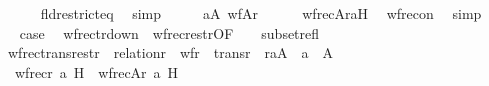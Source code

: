 \begin{isabellebody}
\ \ \ \ \isamarkupfalse%
\ fld{\isacharunderscore}{\kern0pt}restrict{\isacharunderscore}{\kern0pt}eq\ \isamarkupfalse%
\ simp\isanewline
\ \ \isamarkupfalse%
\ \isamarkupfalse%
\ {\isacartoucheopen}a{\isasymin}A{\isacartoucheclose}\ {\isacartoucheopen}wf{\isacharbrackleft}{\kern0pt}A{\isacharbrackright}{\kern0pt}{\isacharparenleft}{\kern0pt}r{\isacharparenright}{\kern0pt}{\isacartoucheclose}\isanewline
\ \ \isamarkupfalse%
\ {\isachardoublequoteopen}{\isachardot}{\kern0pt}{\isachardot}{\kern0pt}{\isachardot}{\kern0pt}\ {\isacharequal}{\kern0pt}\ wfrec{\isacharbrackleft}{\kern0pt}A{\isacharbrackright}{\kern0pt}{\isacharparenleft}{\kern0pt}r{\isacharcomma}{\kern0pt}a{\isacharcomma}{\kern0pt}H{\isacharparenright}{\kern0pt}{\isachardoublequoteclose}\ \isamarkupfalse%
\ wfrec{\isacharunderscore}{\kern0pt}on\ \isamarkupfalse%
\ simp\isanewline
\ \ \isamarkupfalse%
\ \isamarkupfalse%
\ {\isacharquery}{\kern0pt}case\ \isacommand{{\isachardot}{\kern0pt}}\isamarkupfalse%
\isanewline
{}\isamarkupfalse%
%
\endisatagproof
{\isafoldproof}%
%
\isadelimproof
\isanewline
%
\endisadelimproof
\isanewline
{}\isamarkupfalse%
\ wfrec{\isacharunderscore}{\kern0pt}tr{\isacharunderscore}{\kern0pt}down\ {\isacharequal}{\kern0pt}\ wfrec{\isacharunderscore}{\kern0pt}restr{\isacharbrackleft}{\kern0pt}OF\ {\isacharunderscore}{\kern0pt}\ {\isacharunderscore}{\kern0pt}\ {\isacharunderscore}{\kern0pt}\ subset{\isacharunderscore}{\kern0pt}refl{\isacharbrackright}{\kern0pt}\isanewline
\isanewline
{}\isamarkupfalse%
\ wfrec{\isacharunderscore}{\kern0pt}trans{\isacharunderscore}{\kern0pt}restr\ {\isacharcolon}{\kern0pt}\ {\isachardoublequoteopen}relation{\isacharparenleft}{\kern0pt}r{\isacharparenright}{\kern0pt}\ {\isasymLongrightarrow}\ wf{\isacharparenleft}{\kern0pt}r{\isacharparenright}{\kern0pt}\ {\isasymLongrightarrow}\ trans{\isacharparenleft}{\kern0pt}r{\isacharparenright}{\kern0pt}\ {\isasymLongrightarrow}\ r{\isacharminus}{\kern0pt}{\isacharbackquote}{\kern0pt}{\isacharbackquote}{\kern0pt}{\isacharbraceleft}{\kern0pt}a{\isacharbraceright}{\kern0pt}{\isasymsubseteq}A\ {\isasymLongrightarrow}\ a\ {\isasymin}\ A\ {\isasymLongrightarrow}\isanewline
\ \ wfrec{\isacharparenleft}{\kern0pt}r{\isacharcomma}{\kern0pt}\ a{\isacharcomma}{\kern0pt}\ H{\isacharparenright}{\kern0pt}\ {\isacharequal}{\kern0pt}\ wfrec{\isacharbrackleft}{\kern0pt}A{\isacharbrackright}{\kern0pt}{\isacharparenleft}{\kern0pt}r{\isacharcomma}{\kern0pt}\ a{\isacharcomma}{\kern0pt}\ H{\isacharparenright}{\kern0pt}{\isachardoublequoteclose}\isanewline

\end{isabellebody}
